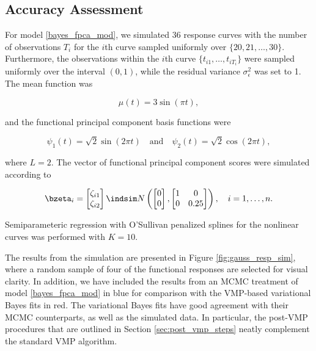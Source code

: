 \documentclass[12pt]{article}
\def\sigsqeps{\sigma^2_{\epsilon}}
\theoremstyle{plain}
\theoremstyle{definition}
\theoremstyle{remark}
\begin{document}

\subsection{Accuracy Assessment}
\label{sec:acc_ass}

For model \eqref{bayes_fpca_mod}, we simulated 36 response curves with the number
of observations $T_i$ for the $i$th curve sampled uniformly over $\{ 20, 21, \dots, 30 \}$. Furthermore, the
observations within the $i$th curve $\{ t_{i1}, \dots, t_{i T_i} \}$ were sampled uniformly over the interval $(0, 1)$,
while the residual variance $\sigsqeps$ was set to 1. The mean function was

\begin{equation}
	\mu (t) = 3 \sin (\pi t),
\label{mean_func_gauss_sim}
\end{equation}

\noindent and the functional principal component basis functions were

\begin{equation}
	\psi_1 (t) = \sqrt{2} \sin (2 \pi t) \quad
	\text{and} \quad
	\psi_2 (t) = \sqrt{2} \cos (2 \pi t),
\label{bf_gauss_sim}
\end{equation}

\noindent where $L = 2$. The vector of functional principal component scores were simulated according to

\begin{equation}
	\bzeta_i = \begin{bmatrix}
		\zeta_{i1} \\
		\zeta_{i2}
	\end{bmatrix} \indsim N \left(
		\begin{bmatrix}
			0 \\
			0
		\end{bmatrix},
		\begin{bmatrix}
			1 & 0 \\
			0 & 0.25
		\end{bmatrix}
	\right), \quad i = 1, \dots, n.
\label{score_sims}
\end{equation}

\noindent Semiparameteric regression with O'Sullivan penalized splines for the nonlinear curves was performed
with $K = 10$.

The results from the simulation are presented in Figure \ref{fig:gauss_resp_sim}, where a random sample of
four of the functional responses are selected for visual clarity. In addition, we have included the results from an MCMC
treatment of model \eqref{bayes_fpca_mod} in blue for comparison with
the VMP-based variational Bayes fits in red. The variational Bayes fits have good agreement with their MCMC
counterparts, as well as the simulated data.
In particular, the post-VMP procedures that are outlined in Section \ref{sec:post_vmp_steps} neatly
complement the standard VMP algorithm.
\end{document}
